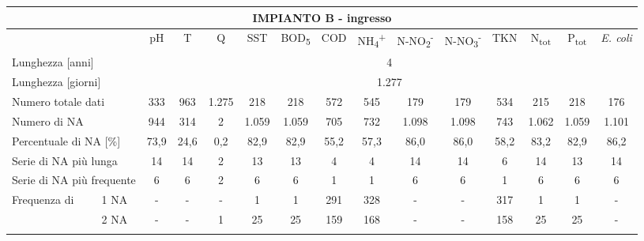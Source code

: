 \begin{sidewaystable}
\begin{center}
\scriptsize
	\begin{tabular}{|ll|c|c|c|c|c|c|c|c|c|c|c|c|c|}
		\hline
		\multicolumn{15}{|c|}{\textbf{IMPIANTO B - ingresso}}                                                                                                   \\ \hline
		\multicolumn{2}{|l|}{}                           & pH   & T    & Q     & SST   & BOD\textsubscript{5}  & COD  & NH\textsubscript{4}\textsuperscript{+} & N-NO\textsubscript{2}\textsuperscript{-} & N-NO\textsubscript{3}\textsuperscript{-} & TKN  & N\textsubscript{tot}  & P\textsubscript{tot}  & \textit{E. coli} \\ \hline
		\multicolumn{2}{|l|}{Lunghezza {[}anni{]}}       & \multicolumn{13}{c|}{4}                                                                              \\ \hline
		\multicolumn{2}{|l|}{Lunghezza {[}giorni{]}}     & \multicolumn{13}{c|}{1.277}                                                                          \\ \hline
		\multicolumn{2}{|l|}{Numero totale dati}         & 333  & 963  & 1.275 & 218   & 218   & 572  & 545  & 179    & 179    & 534  & 215   & 218   & 176     \\ \hline
		\multicolumn{2}{|l|}{Numero di NA}               & 944  & 314  & 2     & 1.059 & 1.059 & 705  & 732  & 1.098  & 1.098  & 743  & 1.062 & 1.059 & 1.101   \\ \hline
		\multicolumn{2}{|l|}{Percentuale di NA {[}\%{]}} & 73,9 & 24,6 & 0,2   & 82,9  & 82,9  & 55,2 & 57,3 & 86,0   & 86,0   & 58,2 & 83,2  & 82,9  & 86,2    \\ \hline
		\multicolumn{2}{|l|}{Serie di NA più lunga}      & 14   & 14   & 2     & 13    & 13    & 4    & 4    & 14     & 14     & 6    & 14    & 13    & 14      \\ \hline
		\multicolumn{2}{|l|}{Serie di NA più frequente}  & 6    & 6    & 2     & 6     & 6     & 1    & 1    & 6      & 6      & 1    & 6     & 6     & 6       \\ \hline
		\multirow{13}{*}{Frequenza di}      & 1 NA       & -    & -    & -     & 1     & 1     & 291  & 328  & -      & -      & 317  & 1     & 1     & -       \\ \cline{3-15} 
		& 2 NA       & -    & -    & 1     & 25    & 25    & 159  & 168  & -      & -      & 158  & 25    & 25    & -       \\ \cline{3-15} 

\end{tabular}
\end{center}
\end{sidewaystable}
